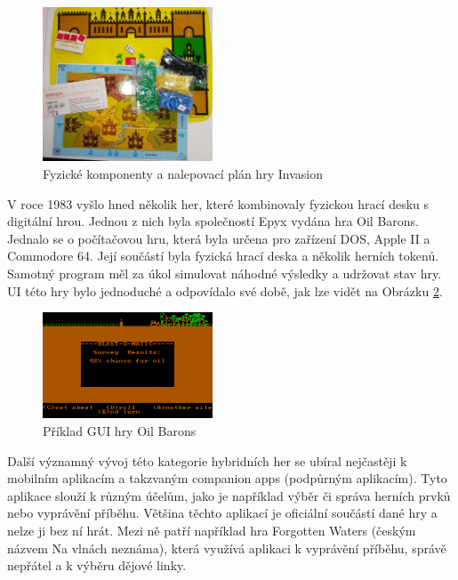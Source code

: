\begin{figure}[H]
    \centering
    \includegraphics[width=0.45\textwidth]{resources/figures/invasion.jpg}
    \caption{Fyzické komponenty a nalepovací plán hry Invasion \cite{invasion}}
    \label{fig:invasion}
\end{figure}

V roce 1983 vyšlo hned několik her, které kombinovaly fyzickou hrací desku s digitální hrou. Jednou z nich byla společností Epyx vydána hra Oil Barons. Jednalo se o počítačovou hru, která byla určena pro zařízení DOS, Apple II a Commodore 64. Její součástí byla fyzická hrací deska a několik herních tokenů. Samotný program měl za úkol simulovat náhodné výsledky a udržovat stav hry. UI této hry bylo jednoduché a odpovídalo své době, jak lze vidět na Obrázku \ref{fig:oil_barons}. \cite{oil_barons}

\begin{figure}[H]
    \centering
    \includegraphics[width=0.45\textwidth]{resources/figures/oil_barons.png}
    \caption{Příklad GUI hry Oil Barons \cite{oil_barons}}
    \label{fig:oil_barons}
\end{figure}

Další významný vývoj této kategorie hybridních her se ubíral nejčastěji k mobilním aplikacím a takzvaným companion apps (podpůrným aplikacím). Tyto aplikace slouží k různým účelům, jako je například výběr či správa herních prvků nebo vyprávění příběhu. Většina těchto aplikací je oficiální součástí dané hry a nelze ji bez ní hrát. Mezi ně patří například hra Forgotten Waters (českým názvem Na vlnách neznáma), která využívá aplikaci k vyprávění příběhu, správě nepřátel a k výběru dějové linky.

